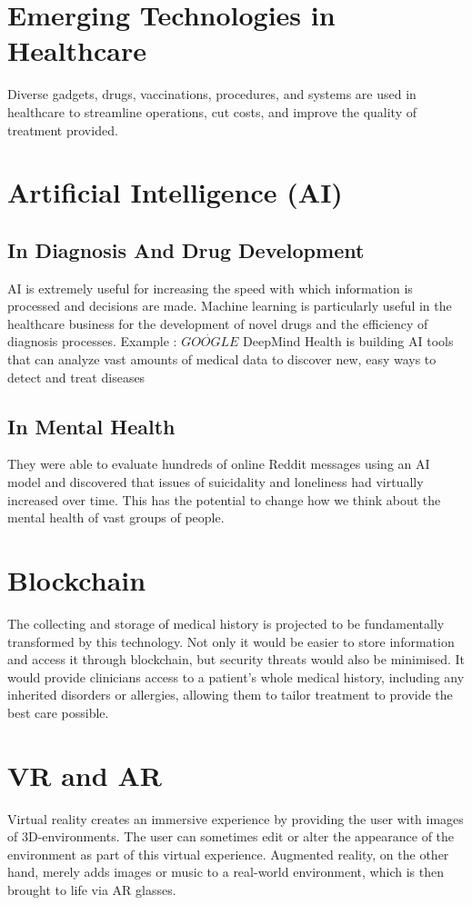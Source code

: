 \documentclass[12pt]{article}
\begin{document}
\section*{ \Huge Emerging Technologies in Healthcare}
\Large Diverse gadgets, drugs, vaccinations, procedures, and systems are used in healthcare to streamline operations, cut costs, and improve the quality of treatment provided.
\section{ \LARGE Artificial Intelligence (AI)}

\subsection{ \Large In Diagnosis And Drug Development}
AI is extremely useful for increasing the speed with which information is processed and decisions are made. Machine learning is particularly useful in the healthcare business for the development of novel drugs and the efficiency of diagnosis processes.
\newline
Example : $ \dot{GOOGLE} $ DeepMind Health is building AI tools that can analyze vast amounts of medical data to discover new, easy ways to detect and treat diseases
\subsection{\Large In Mental Health}
They were able to evaluate hundreds of online Reddit messages using an AI model and discovered that issues of suicidality and loneliness had virtually increased over time. This has the potential to change how we think about the mental health of vast groups of people.

\section{ \LARGE Blockchain}
The collecting and storage of medical history is projected to be fundamentally transformed by this technology. Not only it would be easier to store information and access it through blockchain, but security threats would also be minimised. It would provide clinicians access to a patient's whole medical history, including any inherited disorders or allergies, allowing them to tailor treatment to provide the best care possible.



\section{  \LARGE VR and AR}
Virtual reality creates an immersive experience by providing the user with images of 3D-environments. The user can sometimes edit or alter the appearance of the environment as part of this virtual experience. Augmented reality, on the other hand, merely adds images or music to a real-world environment, which is then brought to life via AR glasses.
\end{document}

